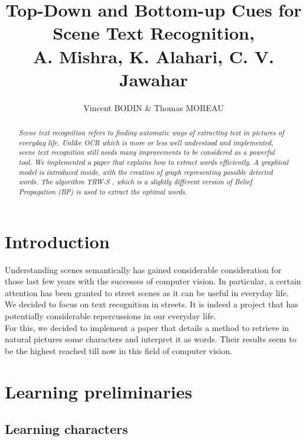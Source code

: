 \documentclass[10pt,a4paper]{article}
\title{Top-Down and Bottom-up Cues for Scene Text Recognition, \\
A. Mishra, K. Alahari, C. V. Jawahar}
\author{Vincent BODIN \& Thomas MOREAU}
\date{}
\begin{document}
\maketitle

\hrulefill
\begin{abstract}
\emph{Scene text recognition refers to finding automatic ways of extracting text in pictures of everyday life. Unlike OCR which is more or less well understood and implemented, scene text recognition still needs many improvements to be considered as a powerful tool. We implemented a paper \cite{Mis} that explains how to extract words efficiently. A graphical model is introduced inside, with the creation of graph representing possible detected words. The algorithm TRW-S \cite{Kol}, which is a slightly different version of Belief Propagation (BP) is used to extract the optimal words.}
\end{abstract}









\section*{Introduction}

Understanding scenes semantically has gained considerable consideration for those last few years with the successes of computer vision. In particular, a certain attention has been granted to street scenes as it can be useful in everyday life. We decided to focus on text recognition in streets. It is indeed a project that has potentially considerable repercussions in our everyday life. \\

For this, we decided to implement a paper \cite{Mis} that details a method to retrieve in natural pictures some characters and interpret it as words. Their results seem to be the highest reached till now in this field of computer vision.






\section{Learning preliminaries}

\subsection{Learning characters}
\end{document}
